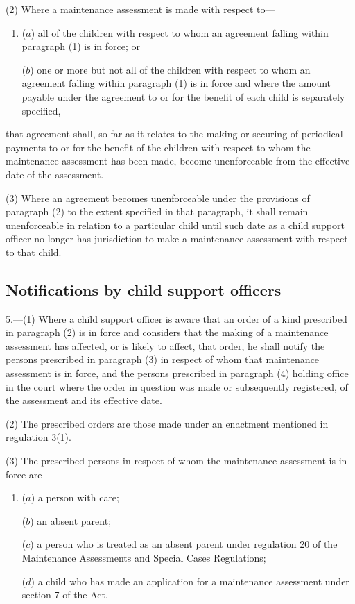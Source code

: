 \documentclass[a4paper]{article}
\begin{document}
(2) Where a maintenance assessment is made with respect to—
\begin{enumerate}\item[]
($a$) all of the children with respect to whom an agreement falling within paragraph (1) is in force; or

($b$) one or more but not all of the children with respect to whom an agreement falling within paragraph (1) is in force and where the amount payable under the agreement to or for the benefit of each child is separately specified,
\end{enumerate}
that agreement shall, so far as it relates to the making or securing of periodical payments to or for the benefit of the children with respect to whom the maintenance assessment has been made, become unenforceable from the effective date of the assessment.

(3) Where an agreement becomes unenforceable under the provisions of paragraph (2) to the extent specified in that paragraph, it shall remain unenforceable in relation to a particular child until such date as a child support officer no longer has jurisdiction to make a maintenance assessment with respect to that child.

\subsection[5. Notifications by child support officers]{Notifications by child support officers}

5.—(1) Where a child support officer is aware that an order of a kind prescribed in paragraph (2) is in force and considers that the making of a maintenance assessment has affected, or is likely to affect, that order, he shall notify the persons prescribed in paragraph (3) in respect of whom that maintenance assessment is in force, and the persons prescribed in paragraph (4) holding office in the court where the order in question was made or subsequently registered, of the assessment and its effective date.

(2) The prescribed orders are those made under an enactment mentioned in regulation 3(1).

(3) The prescribed persons in respect of whom the maintenance assessment is in force are—
\begin{enumerate}\item[]
($a$) a person with care;

($b$) an absent parent;

($c$) a person who is treated as an absent parent under regulation 20 of the Maintenance Assessments and Special Cases Regulations;

($d$) a child who has made an application for a maintenance assessment under section 7 of the Act.
\end{enumerate}
\end{document}

